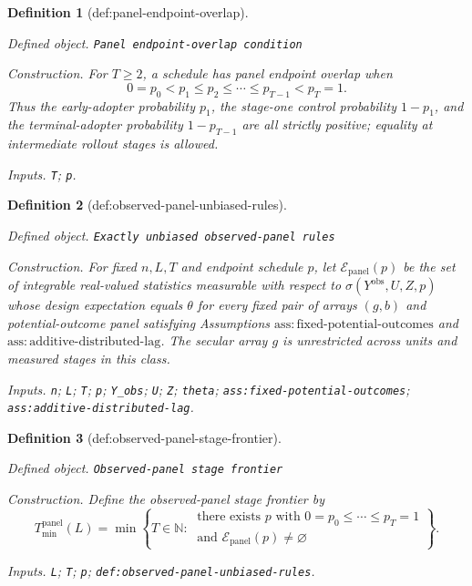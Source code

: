 \documentclass{article}
\newtheorem{definition}{Definition}
\begin{document}
\begin{definition}[def:panel-endpoint-overlap]\label{def:panel-endpoint-overlap}
\par\smallskip\noindent\emph{Defined object.} \texttt{Panel endpoint-\allowbreak{}overlap condition}
\par\smallskip\noindent\emph{Construction.} For \(T\ge2\), a schedule has panel endpoint overlap when
\[
 0=p_0<p_1\le p_2\le\cdots\le p_{T-1}<p_T=1.
\]
Thus the early-adopter probability \(p_1\), the stage-one control probability \(1-p_1\), and the terminal-adopter probability \(1-p_{T-1}\) are all strictly positive; equality at intermediate rollout stages is allowed.
\par\smallskip\noindent\emph{Inputs.} \texttt{T}; \texttt{p}.
\end{definition}

\begin{definition}[def:observed-panel-unbiased-rules]\label{def:observed-panel-unbiased-rules}
\par\smallskip\noindent\emph{Defined object.} \texttt{Exactly unbiased observed-\allowbreak{}panel rules}
\par\smallskip\noindent\emph{Construction.} For fixed \(n,L,T\) and endpoint schedule \(p\), let \(\mathcal E_{\mathrm{panel}}(p)\) be the set of integrable real-valued statistics measurable with respect to \(\sigma(Y^{\mathrm{obs}},U,Z,p)\) whose design expectation equals \(\theta\) for every fixed pair of arrays \((g,b)\) and potential-outcome panel satisfying Assumptions \(\mathrm{ass:fixed\text{-}potential\text{-}outcomes}\) and \(\mathrm{ass:additive\text{-}distributed\text{-}lag}\).  The secular array \(g\) is unrestricted across units and measured stages in this class.
\par\smallskip\noindent\emph{Inputs.} \texttt{n}; \texttt{L}; \texttt{T}; \texttt{p}; \texttt{Y\_\allowbreak{}obs}; \texttt{U}; \texttt{Z}; \texttt{theta}; \texttt{ass:\allowbreak{}fixed-\allowbreak{}potential-\allowbreak{}outcomes}; \texttt{ass:\allowbreak{}additive-\allowbreak{}distributed-\allowbreak{}lag}.
\end{definition}

\begin{definition}[def:observed-panel-stage-frontier]\label{def:observed-panel-stage-frontier}
\par\smallskip\noindent\emph{Defined object.} \texttt{Observed-\allowbreak{}panel stage frontier}
\par\smallskip\noindent\emph{Construction.} Define the observed-panel stage frontier by
\[
 T_{\min}^{\mathrm{panel}}(L)
 =\min\left\{T\in\mathbb N:\ 
 \begin{array}{l}
 \text{there exists }p\text{ with }0=p_0\le\cdots\le p_T=1\\
 \text{and }\mathcal E_{\mathrm{panel}}(p)\ne\varnothing
 \end{array}
 \right\}.
\]
\par\smallskip\noindent\emph{Inputs.} \texttt{L}; \texttt{T}; \texttt{p}; \texttt{def:\allowbreak{}observed-\allowbreak{}panel-\allowbreak{}unbiased-\allowbreak{}rules}.
\end{definition}
\end{document}
